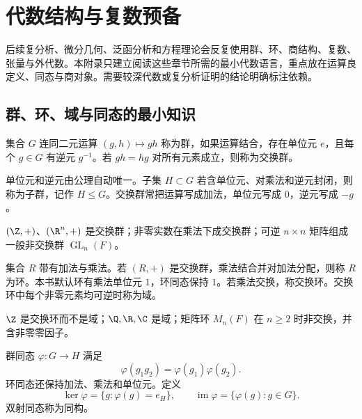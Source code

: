 \chapter{代数结构与复数预备}
\label{app:algebra-complex}
\label{chap:appendix-algebra-complex}

\begin{chapterguide}
后续复分析、微分几何、泛函分析和方程理论会反复使用群、环、商结构、复数、张量与外代数。本附录只建立阅读这些章节所需的最小代数语言，重点放在运算良定义、同态与商对象。需要较深代数或复分析证明的结论明确标注依赖。
\end{chapterguide}

\section{群、环、域与同态的最小知识}

\begin{definition}[群]
集合 \(G\) 连同二元运算 \((g,h)\mapsto gh\) 称为群，如果运算结合，存在单位元 \(e\)，且每个 \(g\in G\) 有逆元 \(g^{-1}\)。若 \(gh=hg\) 对所有元素成立，则称为交换群。
\end{definition}

单位元和逆元由公理自动唯一。子集 \(H\subset G\) 若含单位元、对乘法和逆元封闭，则称为子群，记作 \(H\le G\)。交换群常把运算写成加法，单位元写成 \(0\)，逆元写成 \(-g\)。

\begin{example}
\((\Z,+)\)、\((\R^n,+)\) 是交换群；非零实数在乘法下成交换群；可逆 \(n\times n\) 矩阵组成一般非交换群 \(\operatorname{GL}_n(F)\)。
\end{example}

\begin{definition}[环与域]
集合 \(R\) 带有加法与乘法。若 \((R,+)\) 是交换群，乘法结合并对加法分配，则称 \(R\) 为环。本书默认环有乘法单位元 \(1\)，环同态保持 \(1\)。若乘法交换，称交换环。交换环中每个非零元素均可逆时称为域。
\end{definition}

\(\Z\) 是交换环而不是域；\(\Q,\R,\C\) 是域；矩阵环 \(M_n(F)\) 在 \(n\ge2\) 时非交换，并含非零零因子。

\begin{definition}[同态、核与像]
群同态 \(\varphi:G\to H\) 满足
\[
 \varphi(g_1g_2)=\varphi(g_1)\varphi(g_2).
\]
环同态还保持加法、乘法和单位元。定义
\[
 \ker\varphi=\{g:\varphi(g)=e_H\},\qquad
 \operatorname{im}\varphi=\{\varphi(g):g\in G\}.
\]
双射同态称为同构。
\end{definition}


